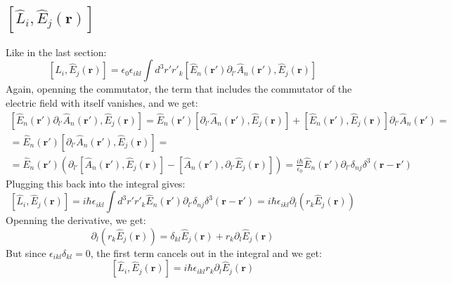 \documentclass{article}
\begin{document}
\subsection{$\left[\hat{L}_{i}, \hat{E}_j(\boldsymbol{r})\right]$}
Like in the last section:
\begin{equation}
    \left[\hat{L}_{i}, \hat{E}_j(\boldsymbol{r})\right] = \epsilon_0 \epsilon_{ikl} \int d^3 r' r'_k \left[\hat{E}_n(\boldsymbol{r'}) \partial_{l'}\hat{A}_n(\boldsymbol{r'}), \hat{E}_j(\boldsymbol{r})\right]
\end{equation}
Again, openning the commutator, the term that includes the commutator of the electric field with itself vanishes, and we get:
\begin{equation}
\begin{gathered}
    \left[\hat{E}_n(\boldsymbol{r'}) \partial_{l'}\hat{A}_n(\boldsymbol{r'}), \hat{E}_j(\boldsymbol{r})\right] = 
    \hat{E}_n(\boldsymbol{r'}) \left[\partial_{l'}\hat{A}_n(\boldsymbol{r'}), \hat{E}_j(\boldsymbol{r})\right] +
    \left[\hat{E}_n(\boldsymbol{r'}), \hat{E}_j(\boldsymbol{r})\right] \partial_{l'}\hat{A}_n(\boldsymbol{r'}) = \\ = 
    \hat{E}_n(\boldsymbol{r'}) \left[\partial_{l'}\hat{A}_n(\boldsymbol{r'}), \hat{E}_j(\boldsymbol{r})\right] = \\ =
    \hat{E}_n(\boldsymbol{r'}) \left(
        \partial_{l'}\left[\hat{A}_n(\boldsymbol{r'}), \hat{E}_j(\boldsymbol{r})\right] -
        \left[\hat{A}_n(\boldsymbol{r'}), \partial_{l'}\hat{E}_j(\boldsymbol{r})\right]
    \right) = \frac{i\hbar}{\epsilon_0} \hat{E}_n(\boldsymbol{r'}) \partial_{l'}\delta_{nj}\delta^3(\boldsymbol{r} - \boldsymbol{r'})
\end{gathered}
\end{equation}
Plugging this back into the integral gives:
\begin{equation}
    \left[\hat{L}_{i}, \hat{E}_j(\boldsymbol{r})\right] = i\hbar \epsilon_{ikl} \int d^3 r' r'_k \hat{E}_n(\boldsymbol{r'}) \partial_{l'}\delta_{nj}\delta^3(\boldsymbol{r} - \boldsymbol{r'}) = i\hbar \epsilon_{ikl} \partial_l \left(r_k \hat{E}_j(\boldsymbol{r})\right)
\end{equation}
Openning the derivative, we get:
\begin{equation}
    \partial_l \left(r_k \hat{E}_j(\boldsymbol{r})\right) = \delta_{kl} \hat{E}_j(\boldsymbol{r}) + r_k \partial_l \hat{E}_j(\boldsymbol{r})
\end{equation}
But since $\epsilon_{ikl}\delta_{kl} = 0$, the first term cancels out in the integral and we get:
\begin{equation}
    \left[\hat{L}_{i}, \hat{E}_j(\boldsymbol{r})\right] = i\hbar \epsilon_{ikl} r_k \partial_l \hat{E}_j(\boldsymbol{r})
\end{equation}
\end{document}
